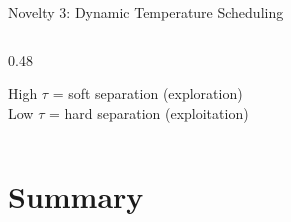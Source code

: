 \documentclass[aspectratio=169]{beamer}
\begin{document}
\begin{frame}{Novelty 3: Dynamic Temperature Scheduling}
\begin{columns}[T]
\begin{column}{0.48\textwidth}

            \vspace{0.3cm}
            {\footnotesize High $\tau$ = soft separation (exploration)\\
            Low $\tau$ = hard separation (exploitation)}
        \end{column}
    \end{columns}
\end{frame}

\section{Summary}
\end{document}
